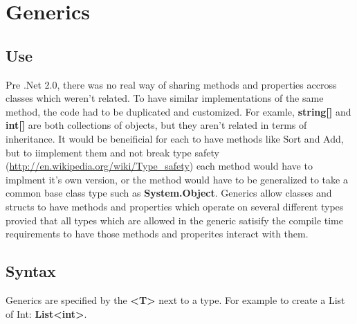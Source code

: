 \documentclass {amsart}
\begin{document}
	\section{Generics}
		\subsection{Use}  Pre .Net 2.0, there was no real way of sharing methods and properties accross classes which weren't related.  To have similar implementations of the same method, the code had to be duplicated and customized.  For examle, {\bf string[] } and {\bf int[]} are both collections of objects, but they aren't related in terms of inheritance.  It would be beneificial for each to have methods like Sort and Add, but to iimplement them and not break type safety (\url{http://en.wikipedia.org/wiki/Type_safety}) each method would have to implment it's own version, or the method would have to be generalized to take a common base class type such as {\bf System.Object}.  Generics allow classes and structs to have methods and properties which operate on several different types provied that all types which are allowed in the generic satisify the compile time requirements to have those methods and properites interact with them.  
		\subsection{Syntax}  Generics are specified by the {\bf \textless T\textgreater} next to a type.  For example to create a List of Int: {\bf List\textless int\textgreater}.  
\end{document}
